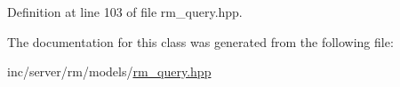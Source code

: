 Definition at line 103 of file rm\+\_\+query.\+hpp.



The documentation for this class was generated from the following file\+:\begin{DoxyCompactItemize}
\item 
inc/server/rm/models/\hyperlink{rm__query_8hpp}{rm\+\_\+query.\+hpp}\end{DoxyCompactItemize}
